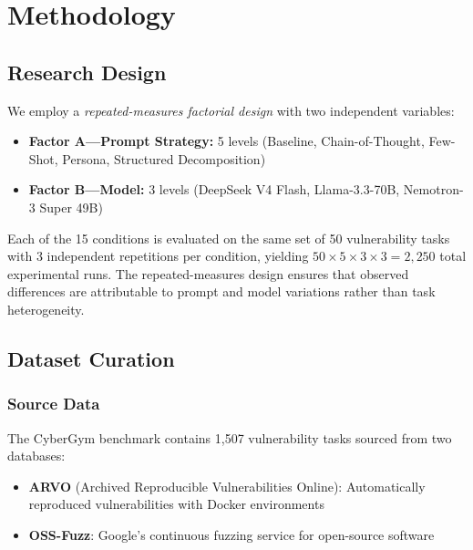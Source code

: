 \documentclass{ieeeaccess}
\begin{document}
\section{Methodology}
\label{sec:methodology}

\subsection{Research Design}

We employ a \emph{repeated-measures factorial design} with two independent variables:

\begin{itemize}
    \item \textbf{Factor A---Prompt Strategy:} 5 levels (Baseline, Chain-of-Thought, Few-Shot, Persona, Structured Decomposition)
    \item \textbf{Factor B---Model:} 3 levels (DeepSeek V4 Flash, Llama-3.3-70B, Nemotron-3 Super 49B)
\end{itemize}

Each of the 15 conditions is evaluated on the same set of 50 vulnerability tasks with 3 independent repetitions per condition, yielding $50 \times 5 \times 3 \times 3 = 2{,}250$ total experimental runs. The repeated-measures design ensures that observed differences are attributable to prompt and model variations rather than task heterogeneity.

\subsection{Dataset Curation}
\label{sec:dataset}

\subsubsection{Source Data}

The CyberGym benchmark contains 1,507 vulnerability tasks sourced from two databases:
\begin{itemize}
    \item \textbf{ARVO} (Archived Reproducible Vulnerabilities Online): Automatically reproduced vulnerabilities with Docker environments
    \item \textbf{OSS-Fuzz}: Google's continuous fuzzing service for open-source software
\end{itemize}
\end{document}
